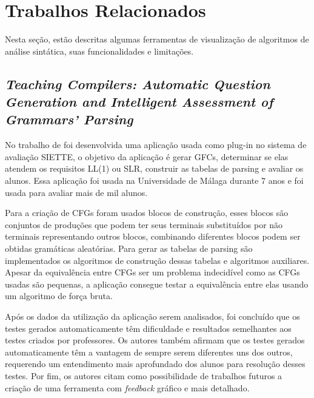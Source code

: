 \chapter{Trabalhos Relacionados}
\label{cap:trabalhos-relacionados}

Nesta seção, estão descritas algumas ferramentas de visualização de algoritmos de análise sintática, suas funcionalidades e limitações.

\section{\textit{Teaching Compilers: Automatic Question Generation and Intelligent Assessment of Grammars' Parsing}}
No trabalho de \textcite{munozquestions} foi desenvolvida uma aplicação usada como plug-in no sistema de avaliação SIETTE, o objetivo da aplicação é gerar GFCs, determinar se elas atendem os requisitos LL(1) ou SLR, construir as tabelas de parsing e avaliar os alunos. Essa aplicação foi usada na Universidade de Málaga durante 7 anos e foi usada para avaliar mais de mil alunos.

Para a criação de CFGs foram usados blocos de construção, esses blocos são conjuntos de produções que podem ter seus terminais substituídos por não terminais representando outros blocos, combinando diferentes blocos podem ser obtidas gramáticas aleatórias. Para gerar as tabelas de parsing são implementados os algoritmos de construção dessas tabelas e algoritmos auxiliares. Apesar da equivalência entre CFGs ser um problema indecidível como as CFGs usadas são pequenas, a aplicação consegue testar a equivalência entre elas usando um algoritmo de força bruta.

Após os dados da utilização da aplicação serem analisados, foi concluído que os testes gerados automaticamente têm dificuldade e resultados semelhantes aos testes criados por professores. Os autores também afirmam que os testes gerados automaticamente têm a vantagem de sempre serem diferentes uns dos outros, requerendo um entendimento mais aprofundado dos alunos para resolução desses testes. Por fim, os autores citam como possibilidade de trabalhos futuros a criação de uma ferramenta com \textit{feedback} gráfico e mais detalhado.


